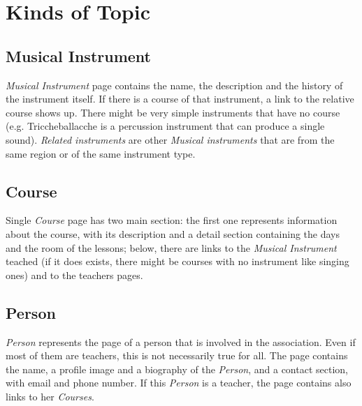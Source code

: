 \documentclass[../../DD.tex]{subfiles}
\begin{document}
\section{Kinds of Topic}
	\subsection{Musical Instrument}
		\textit{Musical Instrument} page contains the name, the description and the history of the instrument itself. If there is a course of that instrument, a link to the relative course shows up. There might be very simple instruments that have no course (e.g. Triccheballacche is a percussion instrument that can produce a single sound). \textit{Related instruments} are other \textit{Musical instruments} that are from the same region or of the same instrument type.
		\newline

	\subsection{Course}
		Single \textit{Course} page has two main section: the first one represents information about the course, with its description and a detail section containing the days and the room of the lessons; below, there are links to the \textit{Musical Instrument} teached (if it does exists, there might be courses with no instrument like singing ones) and to the teachers pages.  
		\newline

	\subsection{Person}
		\textit{Person} represents the page of a person that is involved in the association. Even if most of them are teachers, this is not necessarily true for all. The page contains the name, a profile image and a biography of the \textit{Person}, and a contact section, with email and phone number. If this \textit{Person} is a teacher, the page contains also links to her \textit{Courses}.
		\newline
\end{document}
